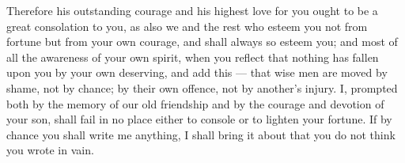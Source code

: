  Therefore his outstanding courage and his highest love for you ought to be a great consolation to you, as also we and the rest who esteem you not from fortune but from your own courage, and shall always so esteem you; and most of all the awareness of your own spirit, when you reflect that nothing has fallen upon you by your own deserving, and add this --- that wise men are moved by shame, not by chance; by their own offence, not by another's injury. I, prompted both by the memory of our old friendship and by the courage and devotion of your son, shall fail in no place either to console or to lighten your fortune. If by chance you shall write me anything, I shall bring it about that you do not think you wrote in vain.
